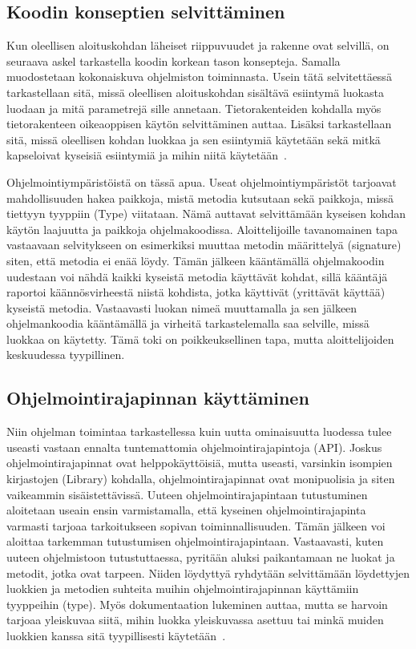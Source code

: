 \documentclass[finnish]{tktltiki2}
\theoremstyle{definition}
\theoremstyle{remark}
\begin{document}
\subsection{Koodin konseptien selvittäminen}
Kun oleellisen aloituskohdan läheiset riippuvuudet ja rakenne ovat selvillä, on seuraava askel tarkastella koodin korkean tason konsepteja. Samalla muodostetaan kokonaiskuva ohjelmiston toiminnasta. Usein tätä selvitettäessä tarkastellaan sitä, missä oleellisen aloituskohdan sisältävä esiintymä luokasta luodaan ja mitä parametrejä sille annetaan. Tietorakenteiden kohdalla myös tietorakenteen oikeaoppisen käytön selvittäminen auttaa. Lisäksi tarkastellaan sitä, missä oleellisen kohdan luokkaa ja sen esiintymiä käytetään sekä mitkä kapseloivat kyseisiä esiintymiä ja mihin niitä käytetään~\cite{questions-during-software-evolution-tasks,eliciting-design-requirements-for-maintenance-oriented-ides}.

Ohjelmointiympäristöistä on tässä apua. Useat ohjelmointiympäristöt tarjoavat mahdollisuuden hakea paikkoja, mistä metodia kutsutaan sekä paikkoja, missä tiettyyn tyyppiin (Type) viitataan. Nämä auttavat selvittämään kyseisen kohdan käytön laajuutta ja paikkoja ohjelmakoodissa. Aloittelijoille tavanomainen tapa vastaavaan selvitykseen on esimerkiksi muuttaa metodin määrittelyä (signature) siten, että metodia ei enää löydy. Tämän jälkeen kääntämällä ohjelmakoodin uudestaan voi nähdä kaikki kyseistä metodia käyttävät kohdat, sillä kääntäjä raportoi käännösvirheestä niistä kohdista, jotka käyttivät (yrittävät käyttää) kyseistä metodia. Vastaavasti luokan nimeä muuttamalla ja sen jälkeen ohjelmankoodia kääntämällä ja virheitä tarkastelemalla saa selville, missä luokkaa on käytetty. Tämä toki on poikkeuksellinen tapa, mutta aloittelijoiden keskuudessa tyypillinen.

\subsection{Ohjelmointirajapinnan käyttäminen}
Niin ohjelman toimintaa tarkastellessa kuin uutta ominaisuutta luodessa tulee useasti vastaan ennalta tuntemattomia ohjelmointirajapintoja (API). Joskus ohjelmointirajapinnat ovat helppokäyttöisiä, mutta useasti, varsinkin isompien kirjastojen (Library) kohdalla, ohjelmointirajapinnat ovat monipuolisia ja siten vaikeammin sisäistettävissä.
Uuteen ohjelmointirajapintaan tutustuminen aloitetaan useain ensin varmistamalla, että kyseinen ohjelmointirajapinta varmasti tarjoaa tarkoitukseen sopivan toiminnallisuuden. Tämän jälkeen voi aloittaa tarkemman tutustumisen ohjelmointirajapintaan.
Vastaavasti, kuten uuteen ohjelmistoon tutustuttaessa, pyritään aluksi paikantamaan ne luokat ja metodit, jotka ovat tarpeen. Niiden löydyttyä ryhdytään selvittämään löydettyjen luokkien ja metodien suhteita muihin ohjelmointirajapinnan käyttämiin tyyppeihin (type). Myös dokumentaation lukeminen auttaa, mutta se harvoin tarjoaa yleiskuvaa siitä, mihin luokka yleiskuvassa asettuu tai minkä muiden luokkien kanssa sitä tyypillisesti käytetään~\cite{asking-and-answering-api-questions}.
\end{document}

